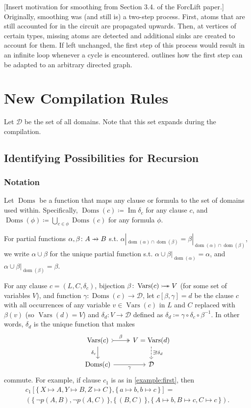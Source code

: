 \documentclass{article}
\theoremstyle{definition}
\theoremstyle{remark}
\newcommand\pfun{\mathrel{\ooalign{\hfil$\mapstochar\mkern5mu$\hfil\cr$\to$\cr}}}
\newcommand*{\twoheadrightarrowtail}{\mathrel{\rightarrowtail\kern-1.9ex\twoheadrightarrow}}
\DeclareMathOperator{\dom}{dom}
\DeclareMathOperator{\Imm}{Im}
\DeclareMathOperator{\Doms}{Doms}
\DeclareMathOperator{\Vars}{Vars}
\begin{document}
[Insert motivation for smoothing from Section 3.4. of the ForcLift paper.] Originally, smoothing was (and still is) a two-step process. First, atoms that are still accounted for in the circuit are propagated upwards. Then, at vertices of certain types, missing atoms are detected and additional sinks are created to account for them. If left unchanged, the first step of this process would result in an infinite loop whenever a cycle is encountered.  outlines how the first step can be adapted to an arbitrary directed graph.

\section{New Compilation Rules}

Let $\mathcal{D}$ be the set of all domains. Note that this set expands during the compilation.

\subsection{Identifying Possibilities for Recursion}

\subsubsection{Notation}

Let $\Doms$ be a function that maps any clause or formula to the set of domains used within. Specifically, $\Doms(c) \coloneqq \Imm \delta_c$ for any clause $c$, and $\Doms(\phi) \coloneqq \bigcup_{c \in \phi} \Doms(c)$ for any formula $\phi$.

For partial functions $\alpha, \beta\colon A \pfun B$ s.t. $\alpha|_{\dom(\alpha) \cap \dom(\beta)} = \beta|_{\dom(\alpha) \cap \dom(\beta)}$, we write $\alpha \cup \beta$ for the unique partial function s.t. $\alpha \cup \beta|_{\dom(\alpha)} = \alpha$, and $\alpha \cup \beta|_{\dom(\beta)} = \beta$.

For any clause $c = (L, C, \delta_c)$, bijection $\beta\colon \Vars(c) \twoheadrightarrowtail V$ (for some set of variables $V$), and function $\gamma\colon \Doms(c) \to \mathcal{D}$, let $c[\beta, \gamma] = d$ be the clause $c$ with all occurrences of any variable $v \in \Vars(c)$ in $L$ and $C$ replaced with $\beta(v)$ (so $\Vars(d) = V$) and $\delta_d\colon V \to \mathcal{D}$ defined as $\delta_d \coloneqq \gamma \circ \delta_c \circ \beta^{-1}$. In other words, $\delta_d$ is the unique function that makes
\[
\begin{tikzcd}
  \Vars(c) \ar[r, tail, two heads, "\beta"] \arrow[d, swap, "\delta_c"] & V = \Vars(d) \ar[d, dashed, "\exists!\delta_d"] \\
  \Doms(c) \ar[r, swap, "\gamma"] & \mathcal{D}
\end{tikzcd}
\]
commute. For example, if clause $c_1$ is as in \cref{example:first}, then
\begin{multline*}
  c_1[\{\, X \mapsto A, Y \mapsto B, Z \mapsto C \,\}, \{\, a \mapsto b, b \mapsto c \,\}] = \\
  (\{\, \neg p(A, B), \neg p(A, C) \,\}, \{\, (B, C) \,\}, \{\, A \mapsto b, B \mapsto c, C \mapsto c \,\}).
\end{multline*}
\end{document}
